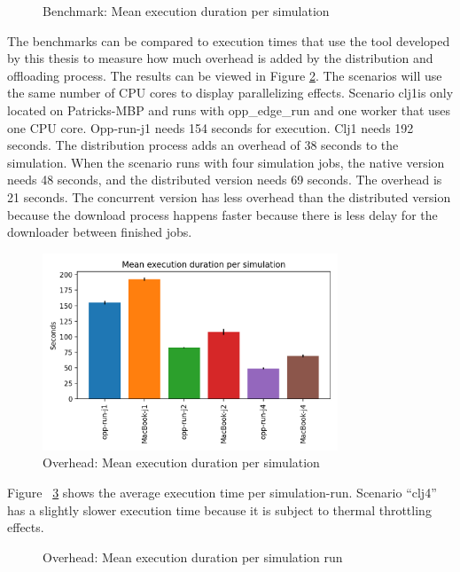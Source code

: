 \begin{figure}[h]
  \centering
  
  \caption{Benchmark: Mean execution duration per simulation}
  \label{fig:eval-benchmark}
\end{figure}

The benchmarks can be compared to execution times that use the tool developed by this thesis to measure how much overhead is added by the distribution and offloading process. The results can be viewed in Figure \ref{fig:eval-overhead}. The scenarios will use the same number of CPU cores to display parallelizing effects. Scenario clj1is only located on Patricks-MBP and runs with opp\_edge\_run and one worker that uses one CPU core. Opp-run-j1 needs 154 seconds for execution. Clj1 needs 192 seconds. The distribution process adds an overhead of 38 seconds to the simulation. When the scenario runs with four simulation jobs, the native version needs 48 seconds, and the distributed version needs 69 seconds. The overhead is 21 seconds. The concurrent version has less overhead than the distributed version because the download process happens faster because there is less delay for the downloader between finished jobs. 
\begin{figure}[h]
  \centering
  \includegraphics[width=250pt]{images/eval/overhead/Mean execution duration per simulation}
  \caption{Overhead: Mean execution duration per simulation}
  \label{fig:eval-overhead}
\end{figure}

Figure ~\ref{fig:eval-overhead-run} shows the average execution time per simulation-run. Scenario “clj4” has a slightly slower execution time because it is subject to thermal throttling effects. 

\begin{figure}[h]
  \centering
  
  \caption{Overhead: Mean execution duration per simulation run}
  \label{fig:eval-overhead-run}
\end{figure}





